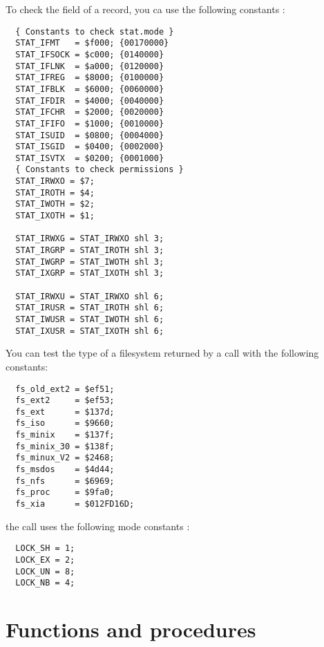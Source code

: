 To check the  field of a  record, you ca use the
following constants :
\begin{verbatim}
  { Constants to check stat.mode }
  STAT_IFMT   = $f000; {00170000}
  STAT_IFSOCK = $c000; {0140000}
  STAT_IFLNK  = $a000; {0120000}
  STAT_IFREG  = $8000; {0100000}
  STAT_IFBLK  = $6000; {0060000}
  STAT_IFDIR  = $4000; {0040000}
  STAT_IFCHR  = $2000; {0020000}
  STAT_IFIFO  = $1000; {0010000}
  STAT_ISUID  = $0800; {0004000}
  STAT_ISGID  = $0400; {0002000}
  STAT_ISVTX  = $0200; {0001000}
  { Constants to check permissions }
  STAT_IRWXO = $7;
  STAT_IROTH = $4;
  STAT_IWOTH = $2;
  STAT_IXOTH = $1;

  STAT_IRWXG = STAT_IRWXO shl 3;
  STAT_IRGRP = STAT_IROTH shl 3;
  STAT_IWGRP = STAT_IWOTH shl 3;
  STAT_IXGRP = STAT_IXOTH shl 3;

  STAT_IRWXU = STAT_IRWXO shl 6;
  STAT_IRUSR = STAT_IROTH shl 6;
  STAT_IWUSR = STAT_IWOTH shl 6;
  STAT_IXUSR = STAT_IXOTH shl 6;
\end{verbatim}
You can test the type of a filesystem returned by a  call with
the following constants:
\begin{verbatim}
  fs_old_ext2 = $ef51;
  fs_ext2     = $ef53;
  fs_ext      = $137d;
  fs_iso      = $9660;
  fs_minix    = $137f;
  fs_minix_30 = $138f;
  fs_minux_V2 = $2468;
  fs_msdos    = $4d44;
  fs_nfs      = $6969;
  fs_proc     = $9fa0;
  fs_xia      = $012FD16D;
\end{verbatim}
the  call uses the following mode constants :
\begin{verbatim}
  LOCK_SH = 1;
  LOCK_EX = 2;
  LOCK_UN = 8;
  LOCK_NB = 4;
\end{verbatim}

\section{Functions and procedures}

